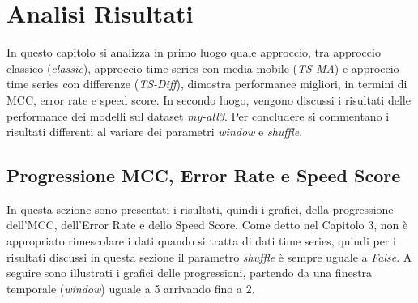 \chapter{Analisi Risultati}

\medskip
In questo capitolo si analizza in primo luogo quale approccio, tra approccio classico (\textit{classic}), approccio time series con media mobile (\textit{TS-MA}) e approccio time series con differenze (\textit{TS-Diff}), dimostra performance migliori, in termini di MCC, error rate e speed score. In secondo luogo, vengono discussi i risultati delle performance dei modelli sul dataset \textit{my-all3}. Per concludere si commentano i risultati differenti al variare dei parametri \textit{window} e \textit{shuffle}.

\section{Progressione MCC, Error Rate e Speed Score}
In questa sezione sono presentati i risultati, quindi i grafici, della progressione dell'MCC, dell'Error Rate e dello Speed Score. Come detto nel Capitolo 3, non \`e appropriato rimescolare i dati quando si tratta di dati time series, quindi per i risultati discussi in questa sezione il parametro \textit{shuffle} \`e sempre uguale a \textit{False}.
A seguire sono illustrati i grafici delle progressioni, partendo da una finestra temporale (\textit{window}) uguale a 5 arrivando fino a 2.
